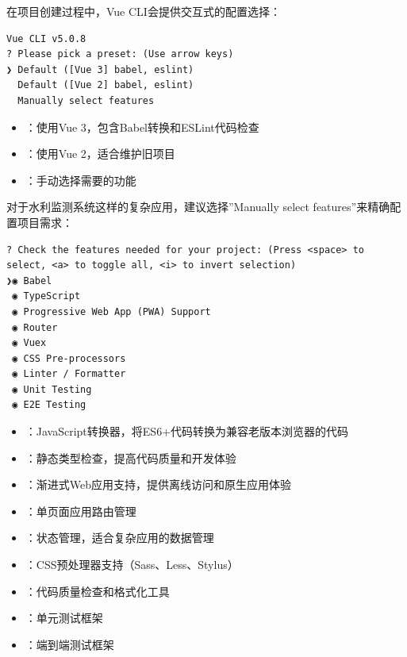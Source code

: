 在项目创建过程中，Vue CLI会提供交互式的配置选择：

\begin{lstlisting}[style=terminal]
Vue CLI v5.0.8
? Please pick a preset: (Use arrow keys)
❯ Default ([Vue 3] babel, eslint) 
  Default ([Vue 2] babel, eslint) 
  Manually select features
\end{lstlisting}


\begin{itemize}
\tightlist
\item
  ：使用Vue 3，包含Babel转换和ESLint代码检查
\item
  ：使用Vue 2，适合维护旧项目
\item
  ：手动选择需要的功能
\end{itemize}

对于水利监测系统这样的复杂应用，建议选择''Manually select features''来精确配置项目需求：

\begin{lstlisting}[style=terminal]
? Check the features needed for your project: (Press <space> to select, <a> to toggle all, <i> to invert selection)
❯◉ Babel
 ◉ TypeScript
 ◉ Progressive Web App (PWA) Support
 ◉ Router
 ◉ Vuex
 ◉ CSS Pre-processors
 ◉ Linter / Formatter
 ◉ Unit Testing
 ◉ E2E Testing
\end{lstlisting}


\begin{itemize}
\tightlist
\item
  ：JavaScript转换器，将ES6+代码转换为兼容老版本浏览器的代码
\item
  ：静态类型检查，提高代码质量和开发体验
\item
  ：渐进式Web应用支持，提供离线访问和原生应用体验
\item
  ：单页面应用路由管理
\item
  ：状态管理，适合复杂应用的数据管理
\item
  ：CSS预处理器支持（Sass、Less、Stylus）
\item
  ：代码质量检查和格式化工具
\item
  ：单元测试框架
\item
  ：端到端测试框架
\end{itemize}

